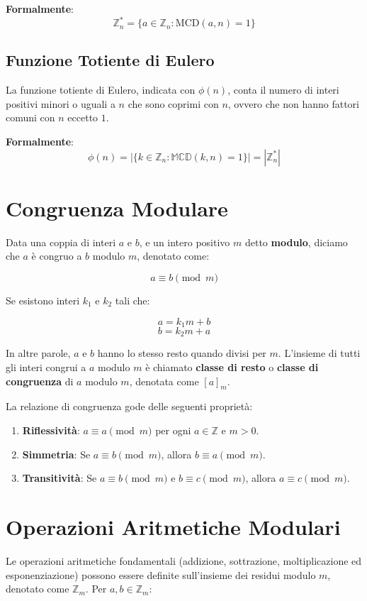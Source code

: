 \documentclass[a4paper,12pt]{report}
\begin{document}
\textbf{Formalmente}: \[\mathbb{Z}_n^* = \{a \in \mathbb{Z}_n : \text{MCD}(a, n) = 1\}\]

\subsection*{Funzione Totiente di Eulero}
La funzione totiente di Eulero, indicata con $\phi(n)$, conta il numero di interi positivi minori o uguali a $n$ che sono coprimi con $n$, ovvero che non hanno fattori comuni con $n$ eccetto $1$. 

\textbf{Formalmente}:\[\phi(n) = |\{k \in \mathbb{Z}_n : \mathbb{MCD}(k, n) = 1\}| = |\mathbb{Z}_n^*|\]

\section{Congruenza Modulare}

Data una coppia di interi $a$ e $b$, e un intero positivo $m$ detto \textbf{modulo}, diciamo che $a$ è congruo a $b$ modulo $m$, denotato come:

$$a \equiv b \pmod{m}$$

Se esistono interi $k_1$ e $k_2$ tali che:

$$a = k_1m + b$$
$$b = k_2m + a$$

In altre parole, $a$ e $b$ hanno lo stesso resto quando divisi per $m$. L'insieme di tutti gli interi congrui a $a$ modulo $m$ è chiamato \textbf{classe di resto} o \textbf{classe di congruenza} di $a$ modulo $m$, denotata come $[a]_m$.

La relazione di congruenza gode delle seguenti proprietà:

\begin{enumerate}
   \item \textbf{Riflessività}: $a \equiv a \pmod{m}$ per ogni $a \in \mathbb{Z}$ e $m > 0$.
   \item \textbf{Simmetria}: Se $a \equiv b \pmod{m}$, allora $b \equiv a \pmod{m}$.
   \item \textbf{Transitività}: Se $a \equiv b \pmod{m}$ e $b \equiv c \pmod{m}$, allora $a \equiv c \pmod{m}$.
\end{enumerate}
\newpage
\section{Operazioni Aritmetiche Modulari}
Le operazioni aritmetiche fondamentali (addizione, sottrazione, moltiplicazione ed esponenziazione) possono essere definite sull'insieme dei residui modulo $m$, denotato come $\mathbb{Z}_m$. Per $a, b \in \mathbb{Z}_m$:
\end{document}
